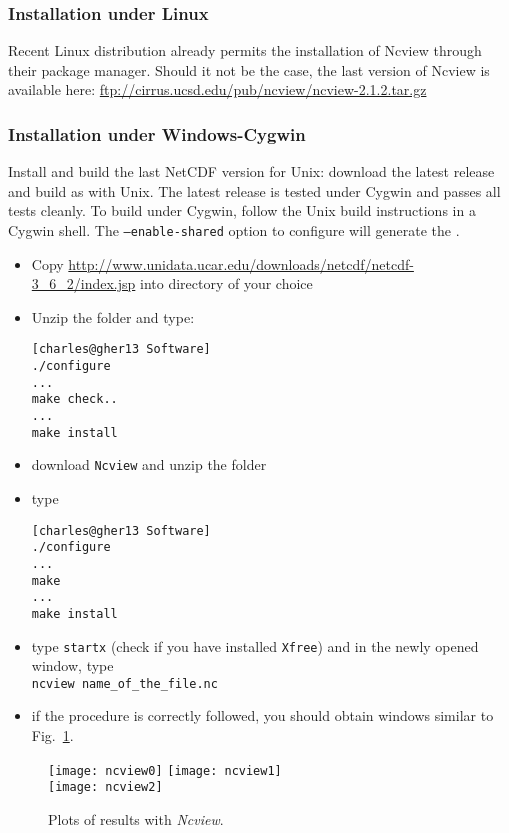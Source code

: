 \subsubsection{Installation under Linux}

Recent Linux distribution already permits the installation of Ncview through their package manager. Should it not be the case, the last version of Ncview is available here: \url{ftp://cirrus.ucsd.edu/pub/ncview/ncview-2.1.2.tar.gz}

\subsubsection{Installation under Windows-Cygwin}

Install and build the last NetCDF version for Unix: download the latest release and build as with Unix. The latest release is tested under Cygwin and passes all tests cleanly. To build under Cygwin, follow the Unix build instructions in a Cygwin shell. The \texttt{--enable-shared} option to configure will generate the . 


\begin{itemize}
\item Copy \url{http://www.unidata.ucar.edu/downloads/netcdf/netcdf-3_6_2/index.jsp}  into directory of your choice
\item Unzip the folder  and type:
\begin{lstlisting}[style=Bash]
[charles@gher13 Software]
./configure
...
make check..
...
make install
\end{lstlisting}

\item download \texttt{Ncview} and unzip the folder
\item type\\ 
\begin{lstlisting}[style=Bash]
[charles@gher13 Software]
./configure
...
make 
...
make install
\end{lstlisting}

\item type \texttt{startx} (check if you have installed \texttt{Xfree}) and in the newly opened window, type\\
\texttt{ncview name\_of\_the\_file.nc}

\item if the procedure is correctly followed, you should obtain windows similar to Fig.~\ref{fig:ncview}.
\end{itemize}

\begin{figure}[htpb]
\centering
\texttt{[image: ncview0]}\hspace{.5cm} \texttt{[image: ncview1]} \\
\vspace{.5cm}
\texttt{[image: ncview2]} \caption{Plots of results with \textsl{Ncview}.\label{fig:ncview}}
\end{figure}
